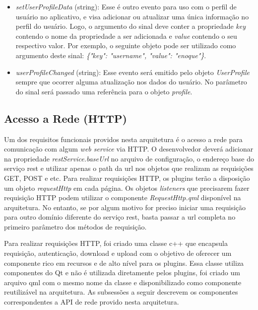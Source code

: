 \begin{itemize}
\begin{itemize}
		\item \textit{setUserProfileData} (string): Esse é outro evento para uso com o perfil de usuário no aplicativo, e visa adicionar ou atualizar uma única informação no perfil do usuário. Logo, o argumento do sinal deve conter a propriedade \textit{key} contendo o nome da propriedade a ser adicionada e \textit{value} contendo o seu respectivo valor. Por exemplo, o seguinte objeto pode ser utilizado como argumento deste sinal: \textit{\{"key": "username", "value": "enoque"\}}.

		\item \textit{userProfileChanged} (string): Esse evento será emitido pelo objeto \textit{UserProfile} sempre que ocorrer alguma atualização nos dados do usuário. No parâmetro do sinal será passado uma referência para o objeto \textit{profile}.
	\end{itemize}
\end{itemize}


\subsection{Acesso a Rede (HTTP)}\label{sec:solucao-desenvolvida}
Um dos requisitos funcionais providos nesta arquitetura é o acesso a rede para comunicação com algum \textit{web service} via HTTP. O desenvolvedor deverá adicionar na propriedade \textit{restService.baseUrl} no arquivo de configuração, o endereço base do serviço rest e utilizar apenas o path da url nos objetos que realizam as requisições GET, POST e etc. Para realizar requisições HTTP, os plugins terão a disposição um objeto \textit{requestHttp} em cada página. Os objetos \textit{listeners} que precisarem fazer requisição HTTP podem utilizar o componente \textit{RequestHttp.qml} disponível na arquitetura. No entanto, se por algum motivo for preciso iniciar uma requisição para outro domínio diferente do serviço rest, basta passar a url completa no primeiro parâmetro dos métodos de requisição.\par

Para realizar requisições HTTP, foi criado uma classe c++ que encapsula requisição, autenticação, download e upload com o objetivo de oferecer um componente rico em recursos e de alto nível para os plugins. Essa classe utiliza componentes do Qt e não é utilizada diretamente pelos plugins, foi criado um arquivo qml com o mesmo nome da classe e disponibilizado como componente reutilizável na arquitetura. As subsessões a seguir descrevem os componentes correspondentes a API de rede provido nesta arquitetura.


